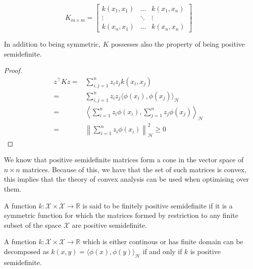 \[
K_{m\times m}=
\begin{bmatrix}
    k(x_1,x_1)       &  \dots & k(x_1,x_n) \\
    \vdots       & \ddots & \vdots \\
    k(x_n, x_1)       & \dots & k(x_n, x_n)
\end{bmatrix}
\]

\begin{proposition}
    In addition to being symmetric, $K$ possesses also the property of being positive semidefinite.    
\end{proposition}

\begin{proof}
    $$
    \begin{aligned}
        z^\intercal K z =& \sum_{i,j=1}^n z_i z_j k(x_i,x_j)
        \\
        =& \sum_{i,j=1}^n z_i z_j \langle \phi(x_i), \phi(x_j) \rangle_{\mathcal{H}}
        \\
        =& \left\langle \sum_{i=1}^n z_i \phi(x_i), \sum_{j=1}^n z_j \phi(x_j)\right\rangle_{\mathcal{H}}
        \\
        =& \left\|\sum_{i=1}^n z_i \phi(x_i) \right\|_{\mathcal{H}}^2 \geq 0
    \end{aligned}
    $$
\end{proof}
We know that positive semidefinite matrices form a cone in the vector space of $n\times n$ matrices. Because of this, we have that the set of such matrices is convex, this implies that the theory of convex analysis can be used when optimising over them.


\begin{definition}
    A function $k: \mathcal{X} \times \mathcal{X} \to \mathbb{R}$ is said to be finitely positive semidefinite if it is a symmetric function for which the matrices formed by restriction to any finite subset of the space $\mathcal{X}$ are positive semidefinite.
\end{definition}

\begin{theorem}    
    A function $k:\mathcal{X} \times \mathcal{X} \to \mathbb{R}$ which is either continous or has finite domain can be decomposed as $k(x,y)=\langle \phi(x), \phi(y) \rangle_{\mathcal{H}}$ if and only if $k$ is positive semidefinite.
\end{theorem}

